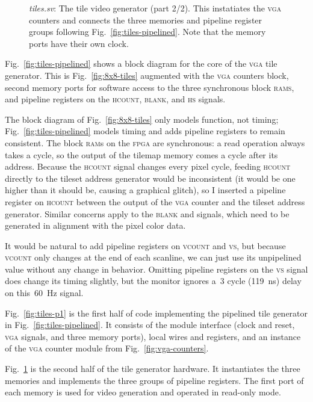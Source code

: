 \documentclass[11pt]{article}
\newcommand{\figref}[1]{Fig.~\ref{fig:#1}}
\begin{document}
\begin{figure}
  
  \caption{\emph{tiles.sv}: The tile video generator (part 2/2).  This
    instatiates the \textsc{vga} counters and connects the three
    memories and pipeline register groups following
    \figref{tiles-pipelined}.  Note that the memory ports have their own clock.}
  \label{fig:tiles-p2}
\end{figure}

\figref{tiles-pipelined} shows a block diagram for the core of the
\textsc{vga} tile generator.  This is \figref{8x8-tiles} augmented
with the \textsc{vga} counters block, second memory ports for software
access to the three synchronous block \textsc{rams}, and pipeline
registers on the \textsc{hcount}, \textsc{blank}, and \textsc{hs}
signals.

The block diagram of \figref{8x8-tiles} only models function, not
timing; \figref{tiles-pipelined} models timing and adds pipeline
registers to remain consistent.  The block \textsc{ram}s on the
\textsc{fpga} are synchronous: a read operation always takes a cycle,
so the output of the tilemap memory comes a cycle after its address.
Because the \textsc{hcount} signal changes every pixel cycle, feeding
\textsc{hcount} directly to the tileset address generator would be
inconsistent (it would be one higher than it should be, causing a
graphical glitch), so I inserted a pipeline register on
\textsc{hcount} between the output of the \textsc{vga} counter and the
tileset address generator.  Similar concerns apply to the
\textsc{blank} and  signals, which need to be generated in
alignment with the pixel color data.

It would be natural to add pipeline registers on \textsc{vcount}
and \textsc{vs}, but because \textsc{vcount} only changes at the end
of each scanline, we can just use its unpipelined value without any
change in behavior.  Omitting pipeline registers on the \textsc{vs}
signal does change its timing slightly, but the monitor ignores a~3
cycle (119~ns) delay on this~60~Hz signal.

\figref{tiles-p1} is the first half of code implementing the pipelined
tile generator in \figref{tiles-pipelined}.  It consists of the module
interface (clock and reset, \textsc{vga} signals, and three memory
ports), local wires and registers, and an instance of the \textsc{vga}
counter module from \figref{vga-counters}.

\figref{tiles-p2} is the second half of the tile generator hardware.
It instantiates the three memories and implements the three groups of
pipeline registers.  The first port of each memory is used for video
generation and operated in read-only mode.
\end{document}
